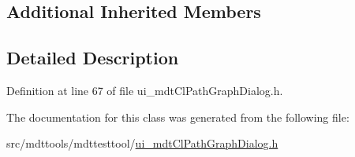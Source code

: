 \subsection*{Additional Inherited Members}


\subsection{Detailed Description}


Definition at line 67 of file ui\-\_\-mdt\-Cl\-Path\-Graph\-Dialog.\-h.



The documentation for this class was generated from the following file\-:\begin{DoxyCompactItemize}
\item 
src/mdttools/mdttesttool/\hyperlink{ui__mdt_cl_path_graph_dialog_8h}{ui\-\_\-mdt\-Cl\-Path\-Graph\-Dialog.\-h}\end{DoxyCompactItemize}
